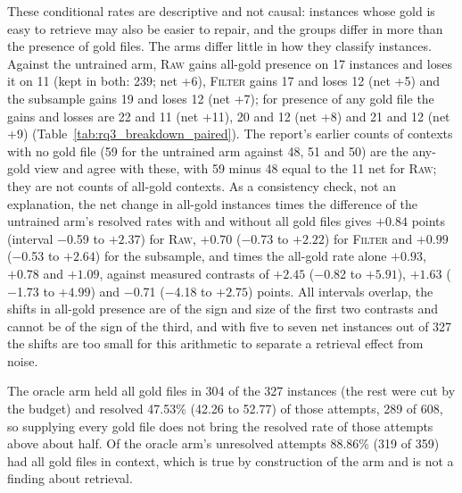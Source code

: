 \documentclass[10pt,twocolumn]{article}
\begin{document}
These conditional rates are descriptive and not causal: instances whose gold is easy to retrieve may also be easier to repair, and the groups differ in more than the presence of gold files.
The arms differ little in how they classify instances. Against the untrained arm, \textsc{Raw} gains all-gold presence on 17 instances and loses it on 11 (kept in both: 239; net +6), \textsc{Filter} gains 17 and loses 12 (net +5) and the subsample gains 19 and loses 12 (net +7); for presence of any gold file the gains and losses are 22 and 11 (net +11), 20 and 12 (net +8) and 21 and 12 (net +9) (Table~\ref{tab:rq3_breakdown_paired}). %
The report's earlier counts of contexts with no gold file (59 for the untrained arm against 48, 51 and 50) are the any-gold view and agree with these, with 59 minus 48 equal to the 11 net for \textsc{Raw}; they are not counts of all-gold contexts. %
As a consistency check, not an explanation, the net change in all-gold instances times the difference of the untrained arm's resolved rates with and without all gold files gives $+0.84$ points (interval $-$0.59 to $+2.37$) for \textsc{Raw}, $+0.70$ ($-$0.73 to $+2.22$) for \textsc{Filter} and $+0.99$ ($-$0.53 to $+2.64$) for the subsample, and times the all-gold rate alone $+0.93$, $+0.78$ and $+1.09$, against measured contrasts of $+2.45$ ($-$0.82 to $+5.91$), $+1.63$ ($-$1.73 to $+4.99$) and $-$0.71 ($-$4.18 to $+2.75$) points. %
All intervals overlap, the shifts in all-gold presence are of the sign and size of the first two contrasts and cannot be of the sign of the third, and with five to seven net instances out of 327 the shifts are too small for this arithmetic to separate a retrieval effect from noise.


The oracle arm held all gold files in 304 of the 327 instances (the rest were cut by the budget) and resolved 47.53\% (42.26 to 52.77) of those attempts, 289 of 608, so supplying every gold file does not bring the resolved rate of those attempts above about half. %
Of the oracle arm's unresolved attempts 88.86\% (319 of 359) had all gold files in context, which is true by construction of the arm and is not a finding about retrieval. %
\end{document}
